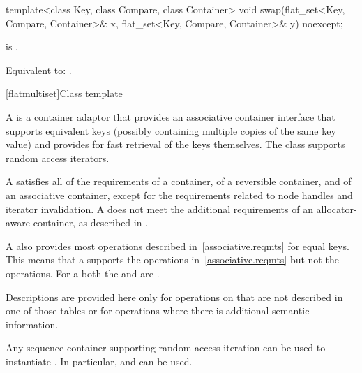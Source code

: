 \begin{codeblock}
\begin{codeblock}
\begin{codeblock}
\begin{addedblock}
%
\begin{itemdecl}
template<class Key, class Compare, class Container>
  void swap(flat_set<Key, Compare, Container>& x,
            flat_set<Key, Compare, Container>& y) noexcept;
\end{itemdecl}

\begin{itemdescr}
\pnum \constraints {} is .

\pnum
\effects Equivalent to: .
\end{itemdescr}

[flatmultiset]{Class template }

\pnum
{}%
A  is a container adaptor that provides an associative
container interface that supports equivalent keys (possibly containing
multiple copies of the same key value) and provides for fast retrieval of the
keys themselves. The  class supports random access
iterators.

\pnum
A  satisfies all of the requirements of a container, of a
reversible container, and of an associative
container, except for the requirements related to
node handles and iterator
invalidation.  A  does
not meet the additional requirements of an allocator-aware container, as
described in .

\pnum
A  also provides most operations described
in~\ref{associative.reqmts} for equal keys.  This means that a
 supports the  operations
in~\ref{associative.reqmts} but not the  operations.  For a
 both the  and  are
.

\pnum
Descriptions are provided here only for operations on  that
are not described in one of those tables or for operations where there is
additional semantic information.

\pnum
Any sequence container supporting random access iteration can be used to
instantiate . In particular, 
and  can be used.


\end{addedblock}
\end{codeblock}
\end{codeblock}
\end{codeblock}
